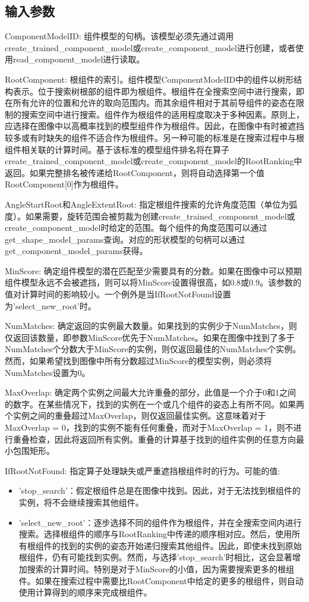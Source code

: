 \documentclass{article}
\begin{document}
\subsection{输入参数}
ComponentModelID: 组件模型的句柄。该模型必须先通过调用create\_trained\_component\_model或create\_component\_model进行创建，或者使用read\_component\_model进行读取。

RootComponent: 根组件的索引。组件模型ComponentModelID中的组件以树形结构表示。位于搜索树根部的组件即为根组件。根组件在全搜索空间中进行搜索，即在所有允许的位置和允许的取向范围内。而其余组件相对于其前导组件的姿态在限制的搜索空间中进行搜索。组件作为根组件的适用程度取决于多种因素。原则上，应选择在图像中以高概率找到的模型组件作为根组件。因此，在图像中有时被遮挡较多或有时缺失的组件不适合作为根组件。另一种可能的标准是在搜索过程中与根组件相关联的计算时间。基于该标准的模型组件排名将在算子create\_trained\_component\_model或create\_component\_model的RootRanking中返回。如果完整排名被传递给RootComponent，则将自动选择第一个值RootComponent[0]作为根组件。

AngleStartRoot和AngleExtentRoot: 指定根组件搜索的允许角度范围（单位为弧度）。如果需要，旋转范围会被剪裁为创建create\_trained\_component\_model或create\_component\_model时给定的范围。每个组件的角度范围可以通过get\_shape\_model\_params查询。对应的形状模型的句柄可以通过get\_component\_model\_params获得。

MinScore: 确定组件模型的潜在匹配至少需要具有的分数。如果在图像中可以预期组件模型永远不会被遮挡，则可以将MinScore设置得很高，如0.8或0.9。该参数的值对计算时间的影响较小。一个例外是当IfRootNotFound设置为'select\_new\_root'时。

NumMatches: 确定返回的实例最大数量。如果找到的实例少于NumMatches，则仅返回该数量，即参数MinScore优先于NumMatches。如果在图像中找到了多于NumMatches个分数大于MinScore的实例，则仅返回最佳的NumMatches个实例。然而，如果希望找到图像中所有分数超过MinScore的模型实例，则必须将NumMatches设置为0。

MaxOverlap: 确定两个实例之间最大允许重叠的部分，此值是一个介于0和1之间的数字。在某些情况下，找到的实例在一个或几个组件的姿态上有所不同。如果两个实例之间的重叠超过MaxOverlap，则仅返回最佳实例。这意味着对于MaxOverlap = 0，找到的实例不能有任何重叠，而对于MaxOverlap = 1，则不进行重叠检查，因此将返回所有实例。重叠的计算基于找到的组件实例的任意方向最小包围矩形。

IfRootNotFound: 指定算子处理缺失或严重遮挡根组件时的行为。可能的值:
\begin{itemize}
	\item ’stop\_search’：假定根组件总是在图像中找到。因此，对于无法找到根组件的实例，将不会继续搜索其他组件。
	\item ’select\_new\_root’：逐步选择不同的组件作为根组件，并在全搜索空间内进行搜索。选择根组件的顺序与RootRanking中传递的顺序相对应。然后，使用所有根组件的找到的实例的姿态开始递归搜索其他组件。因此，即使未找到原始根组件，仍有可能找到实例。然而，与选择'stop\_search'时相比，这会显著增加搜索的计算时间。特别是对于MinScore的小值，因为需要搜索更多的根组件。如果在搜索过程中需要比RootComponent中给定的更多的根组件，则自动使用计算得到的顺序来完成根组件。

\end{itemize}
\end{document}
